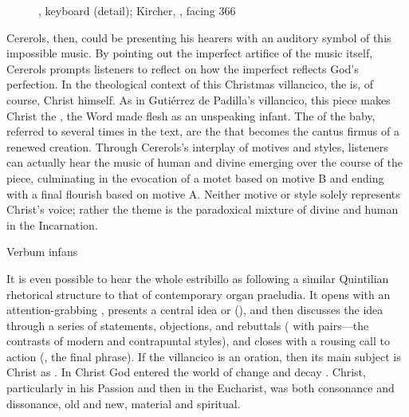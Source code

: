 \begin{figure}
    \caption{, keyboard (detail); Kircher,
    , facing 366}
    \label{fig:Kircher-creation-keyboard}
\end{figure}

Cererols, then, could be presenting his hearers with an auditory symbol of this
impossible music.
By pointing out the imperfect artifice of the music itself, Cererols prompts
listeners to reflect on how the imperfect reflects God's perfection.
In the theological context of this Christmas villancico, the  is, of course, Christ himself.
As in Gutiérrez de Padilla's villancico, this piece makes Christ the
, the Word made flesh as an unspeaking infant.
The  of the baby, referred to several times in the text, are the
 that becomes the cantus firmus of a renewed creation.
Through Cererols's interplay of motives and styles, listeners can actually hear
the music of human and divine emerging over the course of the piece,
culminating in the evocation of a motet based on motive B and ending with a
final flourish based on motive A.
Neither motive or style solely represents Christ's voice; rather the theme is
the paradoxical mixture of divine and human in the Incarnation.

    Verbum infans

It is even possible to hear the whole estribillo as following a similar
Quintilian rhetorical structure to that of contemporary organ praeludia.%
    \Autocite{Jacobson:BuxtehudeRhetoric}
It opens with an attention-grabbing , presents a central idea or
 (), and then discusses the
idea through a series of statements, objections, and rebuttals (
with  pairs---the contrasts of modern and
contrapuntal styles), and closes with a rousing call to action
(, the final phrase).
If the villancico is an oration, then its main subject is Christ as .
In Christ God entered the world of change and decay .
Christ, particularly in his Passion and then in the Eucharist, was both
consonance and dissonance, old and new, material and spiritual.



